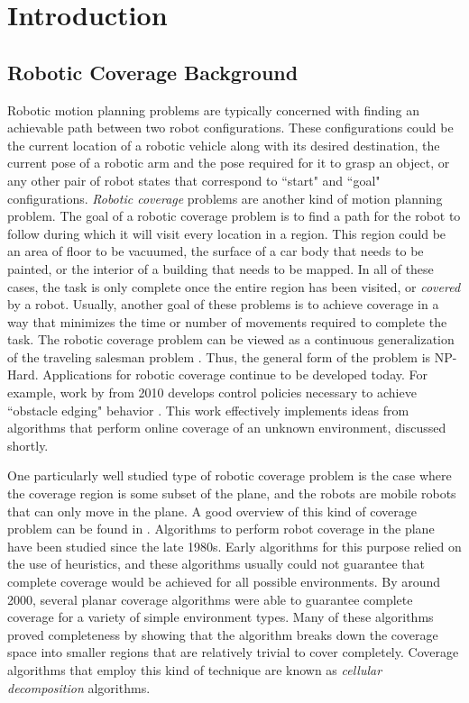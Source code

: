 \chapter{Introduction}

\section{Robotic Coverage Background}

Robotic motion planning problems are typically concerned with finding an achievable path between two robot configurations. These configurations could be the current location of a robotic vehicle along with its desired destination, the current pose of a robotic arm and the pose required for it to grasp an object, or any other pair of robot states that correspond to ``start" and ``goal" configurations. \textit{Robotic coverage} problems are another kind of motion planning problem. The goal of a robotic coverage problem is to find a path for the robot to follow during which it will visit every location in a region. This region could be an area of floor to be vacuumed, the surface of a car body that needs to be painted, or the interior of a building that needs to be mapped. In all of these cases, the task is only complete once the entire region has been visited, or \textit{covered} by a robot. Usually, another goal of these problems is to achieve coverage in a way that minimizes the time or number of movements required to complete the task. The robotic coverage problem can be viewed as a continuous generalization of the traveling salesman problem \cite{Arkin1993}. Thus, the general form of the problem is NP-Hard. Applications for robotic coverage continue to be developed today. For example, work by \citeauthor{Daltorio} from 2010 develops control policies necessary to achieve ``obstacle edging" behavior \cite{Daltorio}. This work effectively implements ideas from algorithms that perform online coverage of an unknown environment, discussed shortly.

One particularly well studied type of robotic coverage problem is the case where the coverage region is some subset of the plane, and the robots are mobile robots that can only move in the plane. A good overview of this kind of coverage problem can be found in \cite{Choset}. Algorithms to perform robot coverage in the plane have been studied since the late 1980s. Early algorithms for this purpose relied on the use of heuristics, and these algorithms usually could not guarantee that complete coverage would be achieved for all possible environments. By around 2000, several planar coverage algorithms were able to guarantee complete coverage for a variety of simple environment types. Many of these algorithms proved completeness by showing that the algorithm breaks down the coverage space into smaller regions that are relatively trivial to cover completely. Coverage algorithms that employ this kind of technique are known as \textit{cellular decomposition} algorithms.

